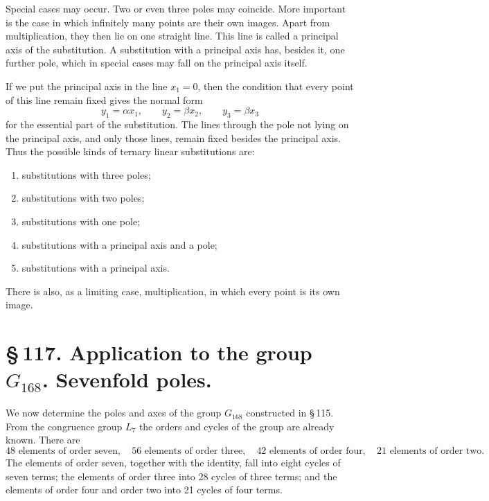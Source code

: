 \documentclass[11pt]{article}
\begin{document}
Special cases may occur. Two or even three poles may coincide. More important is the case in which infinitely many points are their own images. Apart from multiplication, they then lie on one straight line. This line is called a principal axis of the substitution. A substitution with a principal axis has, besides it, one further pole, which in special cases may fall on the principal axis itself.

If we put the principal axis in the line \(x_1=0\), then the condition that every point of this line remain fixed gives the normal form
\begin{equation}
y_1=\alpha x_1,
\qquad y_2=\beta x_2,
\qquad y_3=\beta x_3
\tag{4}
\end{equation}
for the essential part of the substitution. The lines through the pole not lying on the principal axis, and only those lines, remain fixed besides the principal axis. Thus the possible kinds of ternary linear substitutions are:
\begin{enumerate}[label=\arabic*.]
\item substitutions with three poles;
\item substitutions with two poles;
\item substitutions with one pole;
\item substitutions with a principal axis and a pole;
\item substitutions with a principal axis.
\end{enumerate}
There is also, as a limiting case, multiplication, in which every point is its own image.

\section*{\S\,117. Application to the group \(G_{168}\). Sevenfold poles.}

We now determine the poles and axes of the group \(G_{168}\) constructed in \S\,115. From the congruence group \(L_7\) the orders and cycles of the group are already known. There are
\begin{equation}
48\text{ elements of order seven},\quad
56\text{ elements of order three},\quad
42\text{ elements of order four},\quad
21\text{ elements of order two}.
\tag{1}
\end{equation}
The elements of order seven, together with the identity, fall into eight cycles of seven terms; the elements of order three into 28 cycles of three terms; and the elements of order four and order two into 21 cycles of four terms.
\end{document}
